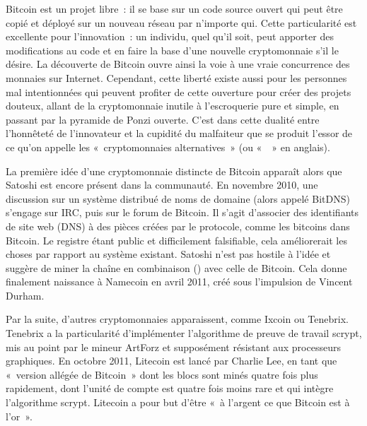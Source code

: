 Bitcoin est un projet libre~: il se base sur un code source ouvert qui peut être copié et déployé sur un nouveau réseau par n'importe qui. Cette particularité est excellente pour l'innovation~: un individu, quel qu'il soit, peut apporter des modifications au code et en faire la base d'une nouvelle cryptomonnaie s'il le désire. La découverte de Bitcoin ouvre ainsi la voie à une vraie concurrence des monnaies sur Internet. Cependant, cette liberté existe aussi pour les personnes mal intentionnées qui peuvent profiter de cette ouverture pour créer des projets douteux, allant de la cryptomonnaie inutile à l'escroquerie pure et simple, en passant par la pyramide de Ponzi ouverte. C'est dans cette dualité entre l'honnêteté de l'innovateur et la cupidité du malfaiteur que se produit l'essor de ce qu'on appelle les «~cryptomonnaies alternatives~» (ou «~~» en anglais).

La première idée d'une cryptomonnaie distincte de Bitcoin apparaît alors que Satoshi est encore présent dans la communauté. En novembre 2010, une discussion sur un système distribué de noms de domaine (alors appelé BitDNS) s'engage sur IRC, puis sur le forum de Bitcoin. Il s'agit d'associer des identifiants de site web (DNS) à des pièces créées par le protocole, comme les bitcoins dans Bitcoin. Le registre étant public et difficilement falsifiable, cela améliorerait les choses par rapport au système existant. Satoshi n'est pas hostile à l'idée et suggère de miner la chaîne en combinaison () avec celle de Bitcoin. Cela donne finalement naissance à Namecoin en avril 2011, créé sous l'impulsion de Vincent Durham.

Par la suite, d'autres cryptomonnaies apparaissent, comme Ixcoin ou Tenebrix. Tenebrix a la particularité d'implémenter l'algorithme de preuve de travail scrypt, mis au point par le mineur ArtForz et supposément résistant aux processeurs graphiques. En octobre 2011, Litecoin est lancé par Charlie Lee, en tant que «~version allégée de Bitcoin~» dont les blocs sont minés quatre fois plus rapidement, dont l'unité de compte est quatre fois moins rare et qui intègre l'algorithme scrypt. Litecoin a pour but d'être «~à l'argent ce que Bitcoin est à l'or~».

